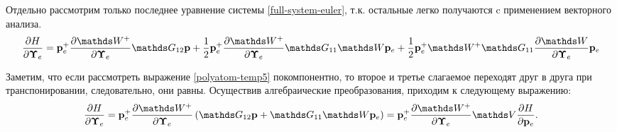 Отдельно рассмотрим только последнее уравнение системы \eqref{full-system-euler}, т.к. остальные легко получаются c применением векторного анализа. 
\begin{gather}
    \frac{\partial H}{\partial \bUpsilon} = \mf{p}_e^+ \frac{\partial \bbW^+}{\partial \bUpsilon} \bbG_{12} \mf{p} + \frac{1}{2} \mf{p}_e^+ \frac{\partial \bbW^+}{\partial \bUpsilon} \bbG_{11} \bbW \pe + \frac{1}{2} \mf{p}_e^+ \bbW^+ \bbG_{11} \frac{\partial \bbW}{\partial \bUpsilon} \pe \label{polyatom-temp5} 
\end{gather}

Заметим, что если рассмотреть выражение \eqref{polyatom-temp5} покомпонентно, то второе и третье слагаемое переходят друг в друга при транспонировании, следовательно, они равны. Осуществив алгебраические преобразования, приходим к следующему выражению: 
\begin{gather}
    \frac{\partial H}{\partial \bUpsilon} = \mf{p}_e^+ \frac{\partial \bbW^+}{\partial \bUpsilon} \lb \bbG_{12} \mf{p} + \bbG_{11} \bbW \pe \rb = \mf{p}_e^+ \frac{\partial \bbW^+}{\partial \bUpsilon} \bbV \frac{\partial H}{\partial \pe}.
\end{gather}

